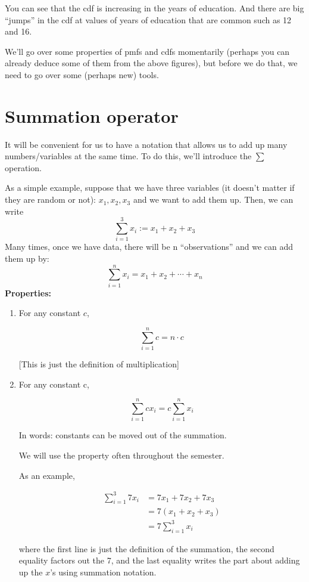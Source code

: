 \documentclass[
  letterpaper,
  DIV=11,
  numbers=noendperiod]{scrreprt}
\begin{document}
You can see that the cdf is increasing in the years of education. And
there are big ``jumps'' in the cdf at values of years of education that
are common such as 12 and 16.

We'll go over some properties of pmfs and cdfs momentarily (perhaps you
can already deduce some of them from the above figures), but before we
do that, we need to go over some (perhaps new) tools.

\section{Summation operator}\label{summation-operator}

It will be convenient for us to have a notation that allows us to add up
many numbers/variables at the same time. To do this, we'll introduce the
\(\sum\) operation.

As a simple example, suppose that we have three variables (it doesn't
matter if they are random or not): \(x_1,x_2,x_3\) and we want to add
them up. Then, we can write \[
  \sum_{i=1}^3 x_i := x_1 + x_2 + x_3
\] Many times, once we have data, there will be n ``observations'' and
we can add them up by: \[
  \sum_{i=1}^n x_i = x_1 + x_2 + \cdots + x_n
\] \textbf{Properties:}

\begin{enumerate}
\def\labelenumi{\arabic{enumi}.}
\item
  For any constant \(c\),

  \[
   \sum_{i=1}^n c = n \cdot c
   \]

  {[}This is just the definition of multiplication{]}
\item
  For any constant c,

  \[
     \sum_{i=1}^n c x_i = c \sum_{i=1}^n x_i
   \]

  In words: constants can be moved out of the summation.

  We will use the property often throughout the semester.

  As an example,

  \[
     \begin{aligned}
     \sum_{i=1}^3 7 x_i &= 7x_1 + 7x_2 + 7x_3 \\
     &= 7(x_1 + x_2 + x_3) \\
     &= 7 \sum_{i=1}^3 x_i
     \end{aligned}
   \]

  where the first line is just the definition of the summation, the
  second equality factors out the 7, and the last equality writes the
  part about adding up the \(x\)'s using summation notation.
\end{enumerate}
\end{document}
